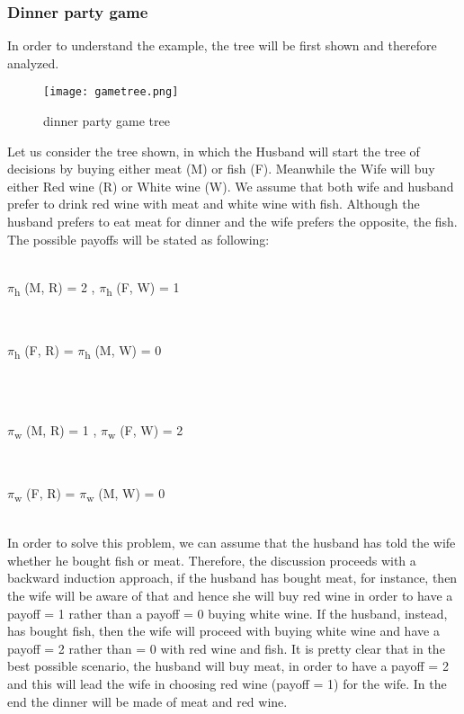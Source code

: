 \documentclass[conference]{IEEEtran}
\begin{document}
\subsubsection{Dinner party game}
In order to understand the example, the tree will be first shown and therefore analyzed.
\begin{figure}[h]
    \centerline{\texttt{[image: gametree.png]}}
    \caption{dinner party game tree}
    \label{gametree}
\end{figure}

Let us consider the tree shown, in which the Husband will start the tree of decisions by buying either meat (M) or fish (F). Meanwhile the Wife will buy either Red wine (R) or White wine (W). We assume that both wife and husband prefer to drink red wine with meat and white wine with fish. Although the husband prefers to eat meat for dinner and the wife prefers the opposite, the fish. The possible payoffs will be stated as following:\\ \\
\centerline{$\pi$\textsubscript{h} (M, R) = 2 ,  $\pi$\textsubscript{h} (F, W) = 1} \\
\centerline{$\pi$\textsubscript{h} (F, R) = $\pi$\textsubscript{h} (M, W) = 0} \\\\
\centerline{$\pi$\textsubscript{w} (M, R) = 1 ,  $\pi$\textsubscript{w} (F, W) = 2} \\
\centerline{$\pi$\textsubscript{w} (F, R) = $\pi$\textsubscript{w} (M, W) = 0}
\\

In order to solve this problem, we can assume that the husband has told the wife whether he bought fish or meat. Therefore, the discussion proceeds with a backward induction approach, if the husband has bought meat, for instance, then the wife will be aware of that and hence she will buy red wine in order to have a payoff = 1 rather than a payoff = 0 buying white wine. If the husband, instead, has bought fish, then the wife will proceed with buying white wine and have a payoff = 2 rather than = 0 with red wine and fish.
It is pretty clear that in the best possible scenario, the husband will buy meat, in order to have a payoff = 2 and this will lead the wife in choosing red wine (payoff = 1) for the wife. In the end the dinner will be made of meat and red wine.
\end{document}
